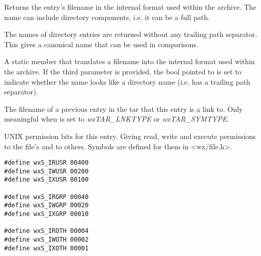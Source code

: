 Returns the entry's filename in the internal format used within the
archive. The name can include directory components, i.e. it can be a
full path.

The names of directory entries are returned without any trailing path
separator. This gives a canonical name that can be used in comparisons.


A static member that translates a filename into the internal format used
within the archive. If the third parameter is provided, the bool pointed
to is set to indicate whether the name looks like a directory name
(i.e. has a trailing path separator).


\label{wxtarentrylinkname}



The filename of a previous entry in the tar that this entry is a link to.
Only meaningful when  is set
to {\it wxTAR\_LNKTYPE} or {\it wxTAR\_SYMTYPE}.


\label{wxtarentrymode}



UNIX permission bits for this entry. Giving read, write and execute permissions
to the file's  and to others.
Symbols are defined for them in <wx/file.h>.

\begin{verbatim}
#define wxS_IRUSR 00400
#define wxS_IWUSR 00200
#define wxS_IXUSR 00100

#define wxS_IRGRP 00040
#define wxS_IWGRP 00020
#define wxS_IXGRP 00010

#define wxS_IROTH 00004
#define wxS_IWOTH 00002
#define wxS_IXOTH 00001

\end{verbatim}


\label{wxtarentrysize}



